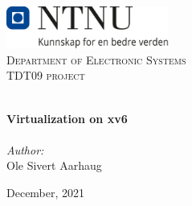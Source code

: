 
\begin{titlepage}
\vbox{ }
\vbox{ }
\begin{center}
\includegraphics[width=0.40\textwidth]{Images/NTNU_logo.png}\\[1cm]
\textsc{\LARGE Department of Electronic Systems}\\[1.5cm]
\textsc{\Large TDT09 project}\\[0.5cm]
\vbox{ }

\HRule \\[0.4cm]
{ \huge \bfseries Virtualization on xv6}\\[0.4cm]
\HRule \\[1.5cm]

\large
\emph{Author:}\\
Ole Sivert Aarhaug
\vfill

{\large December, 2021}
\end{center}
\end{titlepage}
